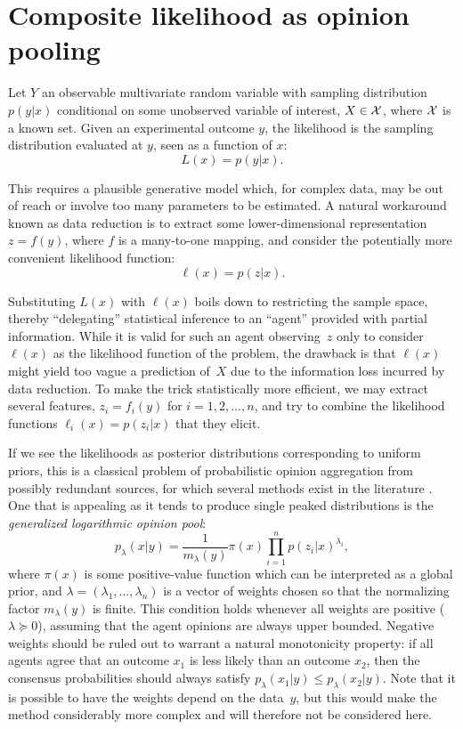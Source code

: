 \documentclass[english]{scrartcl}
\begin{document}
\section{Composite likelihood as opinion pooling}
\label{sec:log_pool}

Let $Y$ an observable multivariate random variable with sampling distribution $p(y|x)$ conditional on some unobserved variable of interest, $X\in{\cal X}$, where ${\cal X}$ is a known set. Given an experimental outcome $y$, the likelihood is the sampling distribution evaluated at $y$, seen as a function of $x$:
$$
L(x) = p(y|x)
.
$$

This requires a plausible generative model which, for complex data, may be out of reach or involve too many parameters to be estimated. A natural workaround known as data reduction is to extract some lower-dimensional representation $z=f(y)$, where $f$ is a many-to-one mapping, and consider the potentially more convenient likelihood function:
$$
\ell(x) = p(z|x)
.
$$

Substituting $L(x)$ with $\ell(x)$ boils down to restricting the sample space, thereby  ``delegating'' statistical inference to an ``agent'' provided with partial information. While it is valid for such an agent observing~$z$ only to consider $\ell(x)$ as the likelihood function of the problem, the drawback is that $\ell(x)$ might yield too vague a prediction of~$X$ due to the information loss incurred by data reduction. To make the trick statistically more efficient, we may extract several features, $z_i=f_i(y)$ for $i=1,2,\ldots,n$, and try to combine the likelihood functions $\ell_i(x) = p(z_i|x)$ that they elicit.

If we see the likelihoods as posterior distributions corresponding to uniform priors, this is a classical problem of probabilistic opinion aggregation from possibly redundant sources, for which several methods exist in the literature \cite{Tarantola-82,Genest-86,Garg-04,Allard-12}. One that is appealing as it tends to produce single peaked distributions is the {\em generalized logarithmic opinion pool}:
\begin{equation}
\label{eq:log_pool}
p_\lambda(x|y) = \frac{1}{m_\lambda(y)} \pi(x) \prod_{i=1}^n p(z_i|x)^{\lambda_i},
\end{equation} 
where $\pi(x)$ is some positive-value function which can be interpreted as a global prior, and $\lambda=(\lambda_1,\ldots,\lambda_n)$ is a vector of weights chosen so that the normalizing factor $m_\lambda(y)$ is finite. This condition holds whenever all weights are positive ($\lambda\succeq 0$), assuming that the agent opinions are always upper bounded. Negative weights should be ruled out to warrant a natural monotonicity property: if all agents agree that an outcome $x_1$ is less likely than an outcome $x_2$, then the consensus probabilities should always satisfy $p_\lambda(x_1|y)\leq p_\lambda(x_2|y)$. Note that it is possible to have the weights depend on the data~$y$, but this would make the method considerably more complex and will therefore not be considered here.
\end{document}
